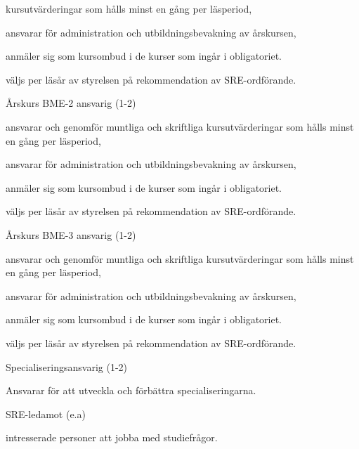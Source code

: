 \documentclass[10pt]{article}
\begin{document}
\begin{emptylist}
\begin{dashlist}
                kursutvärderingar som hålls minst en gång per läsperiod,
            \item ansvarar för administration och utbildningsbevakning av
                årskursen,
            \item anmäler sig som kursombud i de kurser som ingår i
                obligatoriet.
              \item väljs per läsår av styrelsen på rekommendation av SRE-ordförande.
        \end{dashlist}
    \item Årskurs BME-2 ansvarig (1-2)
        \begin{dashlist}
            \item ansvarar och genomför muntliga och skriftliga
                kursutvärderingar som hålls minst en gång per läsperiod,
            \item ansvarar för administration och utbildningsbevakning av
                årskursen,
            \item anmäler sig som kursombud i de kurser som ingår i
                obligatoriet.
             \item väljs per läsår av styrelsen på rekommendation av SRE-ordförande.
        \end{dashlist}
    \item Årskurs BME-3 ansvarig (1-2)
        \begin{dashlist}
            \item ansvarar och genomför muntliga och skriftliga
                kursutvärderingar som hålls minst en gång per läsperiod,
            \item ansvarar för administration och utbildningsbevakning av
                årskursen,
            \item anmäler sig som kursombud i de kurser som ingår i
                obligatoriet.
             \item väljs per läsår av styrelsen på rekommendation av SRE-ordförande.
        \end{dashlist}
    \item Specialiseringsansvarig (1-2)
        \begin{dashlist}
        \item Ansvarar för att utveckla och förbättra specialiseringarna.
        \end{dashlist}
    \item SRE-ledamot (e.a)
        \begin{dashlist}
            \item intresserade personer att jobba med studiefrågor.

\end{dashlist}
\end{emptylist}
\end{document}
